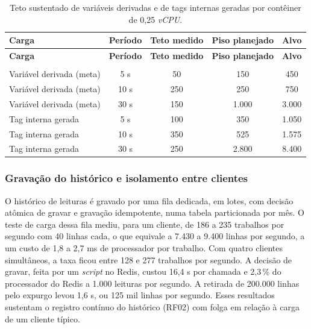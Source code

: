 {\renewcommand{\arraystretch}{1.3}\small
\begin{xltabular}{\textwidth}{lcccc}
        \caption{Teto sustentado de variáveis derivadas e de tags internas geradas por contêiner de 0,25 \emph{vCPU}.}
        \label{tab:cap7_meta}\\
        \hline
        \textbf{Carga} & \textbf{Período} & \textbf{Teto medido} & \textbf{Piso planejado} & \textbf{Alvo} \\
        \hline
        \endfirsthead
        \hline
        \textbf{Carga} & \textbf{Período} & \textbf{Teto medido} & \textbf{Piso planejado} & \textbf{Alvo} \\
        \hline
        \endhead
        \endfoot
         \\
        \endlastfoot
        Variável derivada (meta) & 5 s & 50 & 150 & 450 \\
        \hline
        Variável derivada (meta) & 10 s & 250 & 250 & 750 \\
        \hline
        Variável derivada (meta) & 30 s & 150 & 1.000 & 3.000 \\
        \hline
        Tag interna gerada & 5 s & 100 & 350 & 1.050 \\
        \hline
        Tag interna gerada & 10 s & 350 & 525 & 1.575 \\
        \hline
        Tag interna gerada & 30 s & 250 & 2.800 & 8.400 \\
        \hline
\end{xltabular}}

\subsubsection{Gravação do histórico e isolamento entre clientes}

\par O histórico de leituras é gravado por uma fila dedicada, em lotes, com decisão atômica de gravar e gravação idempotente, numa tabela particionada por mês. O teste de carga dessa fila mediu, para um cliente, de 186 a 235 trabalhos por segundo com 40 linhas cada, o que equivale a 7.430 a 9.400 linhas por segundo, a um custo de 1,8 a 2,7 ms de processador por trabalho. Com quatro clientes simultâneos, a taxa ficou entre 128 e 277 trabalhos por segundo. A decisão de gravar, feita por um \emph{script} no Redis, custou 16,4 \textmu s por chamada e 2,3\,\% do processador do Redis a 1.000 leituras por segundo. A retirada de 200.000 linhas pelo expurgo levou 1,6 s, ou 125 mil linhas por segundo. Esses resultados sustentam o registro contínuo do histórico (RF02) com folga em relação à carga de um cliente típico.

